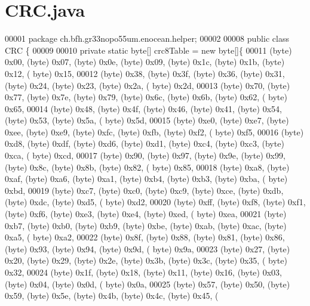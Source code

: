 \section{C\+R\+C.\+java}
\label{CRC_8java_source}

\begin{DoxyCode}
00001 \textcolor{keyword}{package }ch.bfh.gr33nopo55um.enocean.helper;
00002 
00008 \textcolor{keyword}{public} \textcolor{keyword}{class }CRC \{
00009 
00010     \textcolor{keyword}{private} \textcolor{keyword}{static} byte[] crc8Table = \textcolor{keyword}{new} byte[]\{
00011             (byte) 0x00, (byte) 0x07, (byte) 0x0e, (byte) 0x09, (byte) 0x1c, (byte) 0x1b, (byte) 0x12, (
      byte) 0x15,
00012             (byte) 0x38, (byte) 0x3f, (byte) 0x36, (byte) 0x31, (byte) 0x24, (byte) 0x23, (byte) 0x2a, (
      byte) 0x2d,
00013             (byte) 0x70, (byte) 0x77, (byte) 0x7e, (byte) 0x79, (byte) 0x6c, (byte) 0x6b, (byte) 0x62, (
      byte) 0x65,
00014             (byte) 0x48, (byte) 0x4f, (byte) 0x46, (byte) 0x41, (byte) 0x54, (byte) 0x53, (byte) 0x5a, (
      byte) 0x5d,
00015             (byte) 0xe0, (byte) 0xe7, (byte) 0xee, (byte) 0xe9, (byte) 0xfc, (byte) 0xfb, (byte) 0xf2, (
      byte) 0xf5,
00016             (byte) 0xd8, (byte) 0xdf, (byte) 0xd6, (byte) 0xd1, (byte) 0xc4, (byte) 0xc3, (byte) 0xca, (
      byte) 0xcd,
00017             (byte) 0x90, (byte) 0x97, (byte) 0x9e, (byte) 0x99, (byte) 0x8c, (byte) 0x8b, (byte) 0x82, (
      byte) 0x85,
00018             (byte) 0xa8, (byte) 0xaf, (byte) 0xa6, (byte) 0xa1, (byte) 0xb4, (byte) 0xb3, (byte) 0xba, (
      byte) 0xbd,
00019             (byte) 0xc7, (byte) 0xc0, (byte) 0xc9, (byte) 0xce, (byte) 0xdb, (byte) 0xdc, (byte) 0xd5, (
      byte) 0xd2,
00020             (byte) 0xff, (byte) 0xf8, (byte) 0xf1, (byte) 0xf6, (byte) 0xe3, (byte) 0xe4, (byte) 0xed, (
      byte) 0xea,
00021             (byte) 0xb7, (byte) 0xb0, (byte) 0xb9, (byte) 0xbe, (byte) 0xab, (byte) 0xac, (byte) 0xa5, (
      byte) 0xa2,
00022             (byte) 0x8f, (byte) 0x88, (byte) 0x81, (byte) 0x86, (byte) 0x93, (byte) 0x94, (byte) 0x9d, (
      byte) 0x9a,
00023             (byte) 0x27, (byte) 0x20, (byte) 0x29, (byte) 0x2e, (byte) 0x3b, (byte) 0x3c, (byte) 0x35, (
      byte) 0x32,
00024             (byte) 0x1f, (byte) 0x18, (byte) 0x11, (byte) 0x16, (byte) 0x03, (byte) 0x04, (byte) 0x0d, (
      byte) 0x0a,
00025             (byte) 0x57, (byte) 0x50, (byte) 0x59, (byte) 0x5e, (byte) 0x4b, (byte) 0x4c, (byte) 0x45, (

\end{DoxyCode}
